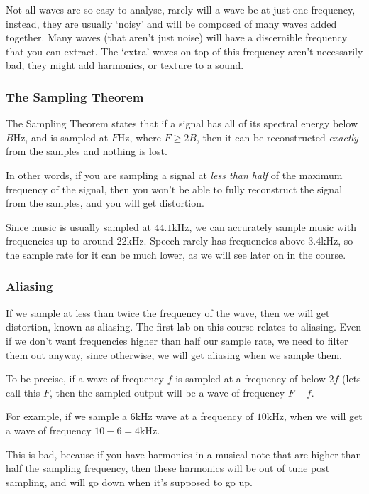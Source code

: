 Not all waves are so easy to analyse, rarely will a wave be at just one
frequency, instead, they are usually `noisy' and will be composed of many waves
added together. Many waves (that aren't just noise) will have a discernible
frequency that you can extract. The `extra' waves on top of this frequency
aren't necessarily bad, they might add harmonics, or texture to a sound.

\subsubsection{The Sampling Theorem}


The Sampling Theorem states that if a signal has all of its spectral energy
below $B$Hz, and is sampled at $F$Hz, where $F \geq 2B$, then it can be
reconstructed \textit{exactly} from the samples and nothing is lost.

In other words, if you are sampling a signal at \textit{less than half} of the
maximum frequency of the signal, then you won't be able to fully reconstruct the
signal from the samples, and you will get distortion.

Since music is usually sampled at $44.1$\si{\kilo\hertz}, we can accurately
sample music with frequencies up to around $22$\si{\kilo\hertz}. Speech rarely
has frequencies above $3.4$\si{\kilo\hertz}, so the sample rate for it can be
much lower, as we will see later on in the course.

\subsubsection{Aliasing}

If we sample at less than twice the frequency of the wave, then we will get
distortion, known as aliasing. The first lab on this course relates to aliasing.
Even if we don't want frequencies higher than half our sample rate, we need to
filter them out anyway, since otherwise, we will get aliasing when we sample
them.

To be precise, if a wave of frequency $f$ is sampled at a frequency of below
$2f$ (lets call this $F$, then the sampled output will be a wave of frequency $F
- f$.

For example, if we sample a $6\si{\kilo\hertz}$ wave at a frequency of $10\si{\kilo\hertz}$, when we will
get a wave of frequency $10-6 = 4\si{\kilo\hertz}$.

This is bad, because if you have harmonics in a musical note that are higher
than half the sampling frequency, then these harmonics will be out of tune post
sampling, and will go down when it's supposed to go up.

